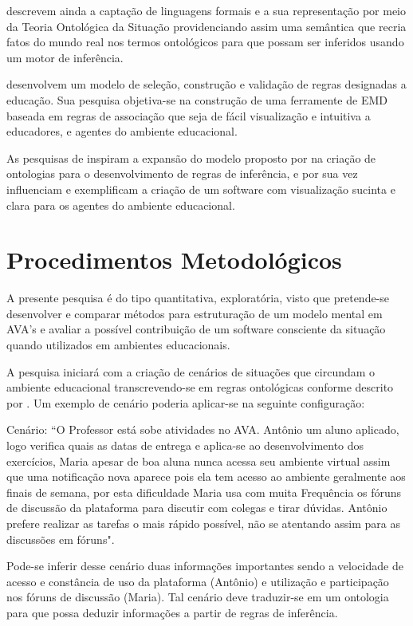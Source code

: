 \documentclass[
	oneside,
	12pt,				%
	a4paper,			%
	english,			%
	brazil,				%
	article
	]{abntex2}
\begin{document}
{ descrevem ainda a captação de linguagens formais e a sua representação por meio da Teoria Ontológica da Situação providenciando assim uma semântica que recria fatos do mundo real nos termos ontológicos para que possam ser inferidos usando um motor de inferência. 

 desenvolvem um modelo de seleção, construção e validação de regras designadas a educação. Sua pesquisa objetiva-se na construção de uma ferramente de EMD baseada em regras de associação que seja de fácil visualização e intuitiva a educadores, e agentes do ambiente educacional.
 
As pesquisas de  inspiram a expansão do modelo proposto por  na criação de ontologias para o desenvolvimento de regras de inferência, e por sua vez  influenciam e exemplificam a criação de um software com visualização sucinta e clara para os agentes do ambiente educacional.

\section{Procedimentos Metodológicos}

A presente pesquisa é do tipo quantitativa, exploratória, visto que pretende-se desenvolver e comparar métodos para estruturação de um modelo mental em AVA's e avaliar a possível contribuição de um software consciente da situação quando utilizados em ambientes educacionais.

A pesquisa iniciará com a criação de cenários de situações que circundam o ambiente educacional transcrevendo-se em regras ontológicas conforme descrito por \cite{Kokar2009}. Um exemplo de cenário poderia aplicar-se na seguinte configuração:

Cenário:
``O Professor está sobe atividades no AVA. Antônio um aluno aplicado, logo verifica quais as datas de entrega e aplica-se ao desenvolvimento dos exercícios, Maria apesar de boa aluna nunca acessa seu ambiente virtual assim que uma notificação nova aparece pois ela tem acesso ao ambiente geralmente aos finais de semana, por esta dificuldade Maria usa com muita Frequência os fóruns de discussão da plataforma para discutir com colegas e tirar dúvidas. Antônio prefere realizar as tarefas o mais rápido possível, não se atentando assim para as discussões em fóruns". 

Pode-se inferir desse cenário duas informações importantes sendo a velocidade de acesso e constância de uso da plataforma (Antônio) e utilização e participação nos fóruns de discussão (Maria). Tal cenário deve traduzir-se em um ontologia para que possa deduzir informações a partir de regras de inferência.

}
\end{document}
